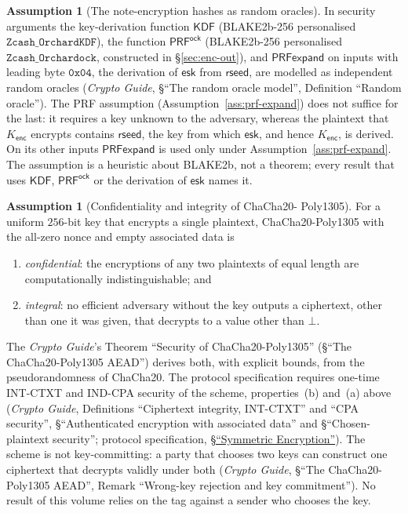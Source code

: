 \documentclass[11pt,a4paper]{article}
\theoremstyle{definition}
\newtheorem{assumption}[theorem]{Assumption}
\begin{document}
\begin{assumption}[The note-encryption hashes as random oracles]%
\label{ass:kdf}
In security arguments the key-derivation function $\mathsf{KDF}$
(BLAKE2b-256 personalised $\texttt{Zcash\_OrchardKDF}$), the function
$\mathsf{PRF}^{\mathsf{ock}}$ (BLAKE2b-256 personalised
$\texttt{Zcash\_Orchardock}$, constructed in \S\ref{sec:enc-out}), and
$\mathsf{PRFexpand}$ on inputs with leading byte $\mathtt{0x04}$, the
derivation of $\mathsf{esk}$ from $\mathsf{rseed}$, are modelled as
independent random oracles (\emph{Crypto Guide}, \S``The random oracle
model'', Definition ``Random oracle''). The PRF assumption
(Assumption~\ref{ass:prf-expand}) does not suffice for the last: it requires
a key unknown to the adversary, whereas the plaintext that $K_{\mathsf{enc}}$
encrypts contains $\mathsf{rseed}$, the key from which $\mathsf{esk}$, and
hence $K_{\mathsf{enc}}$, is derived. On its other inputs
$\mathsf{PRFexpand}$ is used only under Assumption~\ref{ass:prf-expand}. The
assumption is a heuristic about BLAKE2b, not a theorem; every result that
uses $\mathsf{KDF}$, $\mathsf{PRF}^{\mathsf{ock}}$ or the derivation of
$\mathsf{esk}$ names it.
\end{assumption}

\begin{assumption}[Confidentiality and integrity of ChaCha20-\allowbreak
  Poly1305]%
\label{ass:aead}
For a uniform $256$-bit key that encrypts a single plaintext,
ChaCha20-Poly1305 with the all-zero nonce and empty associated data is
\begin{enumerate}
\item[(a)] \emph{confidential}: the encryptions of any two plaintexts of
  equal length are computationally indistinguishable; and
\item[(b)] \emph{integral}: no efficient adversary without the key outputs a
  ciphertext, other than one it was given, that decrypts to a value other
  than $\bot$.
\end{enumerate}
The \emph{Crypto Guide}'s Theorem ``Security of ChaCha20-Poly1305''
(\S``The ChaCha20-Poly1305 AEAD'') derives both, with explicit bounds, from
the pseudorandomness of ChaCha20. The protocol specification requires
one-time INT-CTXT and IND-CPA security of the scheme, properties~(b)
and~(a) above (\emph{Crypto Guide}, Definitions ``Ciphertext integrity,
INT-CTXT'' and ``CPA security'', \S``Authenticated encryption with
associated data'' and \S``Chosen-plaintext security''; protocol
specification,
\href{https://zips.z.cash/protocol/protocol.pdf#abstractsym}%
{\S``Symmetric Encryption''}). The scheme is not
key-committing: a party that chooses two keys can construct one ciphertext
that decrypts validly under both (\emph{Crypto Guide}, \S``The
ChaCha20-Poly1305 AEAD'', Remark ``Wrong-key rejection and key
commitment''). No result of this volume relies on the tag against a sender
who chooses the key.
\end{assumption}
\end{document}
